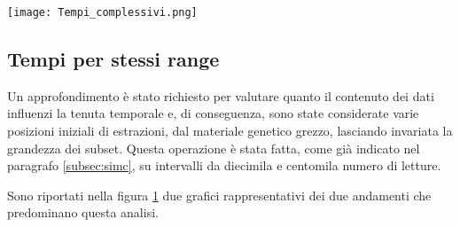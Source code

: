 \begin{table}[H]
  \begin{minipage}[b]{0.4\linewidth}
	\centering
	\texttt{[image: Tempi\_complessivi.png]}	
	\label{fig:Ttot}
  \end{minipage}
  \hfill  
  \begin{varwidth}[b]{0.4\linewidth}
    \centering
    \caption{Pendenze per i tempi complessivi.}
    \label{tab:Ttot}
  \end{varwidth}%
\end{table}

\subsection{Tempi per stessi range}
Un approfondimento è stato richiesto per valutare quanto il contenuto dei dati influenzi la tenuta temporale e, di conseguenza, sono state considerate varie posizioni iniziali di estrazioni, dal materiale genetico grezzo, lasciando invariata la grandezza dei subset.
Questa operazione è stata fatta, come già indicato nel paragrafo \ref{subsec:simc}, su intervalli da diecimila e centomila numero di letture.

Sono riportati nella figura \ref{fig:Trng} due grafici rappresentativi dei due andamenti che predominano questa analisi.
\begin{figure}[H]
\centering
{} \quad
{} \\
\caption{}
\label{fig:Trng}
\end{figure}

